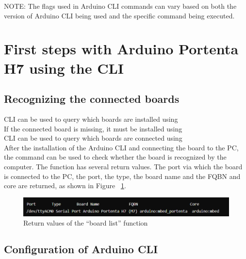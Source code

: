 NOTE: The flags used in Arduino CLI commands can vary based on both the version of Arduino CLI being used and the specific command being executed.

\section{First steps with Arduino Portenta H7 using the CLI}

\subsection{Recognizing the connected boards}

CLI can be used to query which boards are installed using 
\\
If the connected board is missing, it must be installed using 
\\
CLI can be used to query which boards are connected using 
\\
After the installation of the Arduino CLI and connecting the board to the PC, the command  can be used to check whether the board is recognized by the computer. The function  has several return values. The port via which the board is connected to the PC, the port, the type, the board name and the FQBN and core are returned, 
as shown in Figure ~\ref{CLIBoardList}. 
\begin{figure}
	\begin{center}
		\includegraphics[width=0.7\linewidth]{Images/ArduinoCLI/CLIBoardList.png}
		\caption{ Return values of the “board list” function }
		\label{CLIBoardList}
	\end{center}
\end{figure}

\subsection{Configuration of Arduino CLI}

